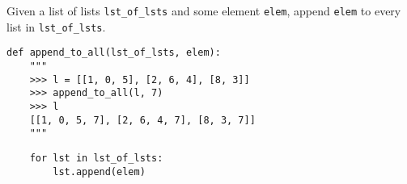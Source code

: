 \begin{blocksection}
\question Given a list of lists \lstinline$lst_of_lsts$ and some element \lstinline$elem$, append \lstinline$elem$ to every list in \lstinline$lst_of_lsts$.

\begin{lstlisting}
def append_to_all(lst_of_lsts, elem):
    """
    >>> l = [[1, 0, 5], [2, 6, 4], [8, 3]]
    >>> append_to_all(l, 7)
    >>> l
    [[1, 0, 5, 7], [2, 6, 4, 7], [8, 3, 7]]
    """
\end{lstlisting}

\begin{solution}[0.75in]
\begin{lstlisting}
    for lst in lst_of_lsts:
        lst.append(elem)
\end{lstlisting}
\end{solution}
\end{blocksection}
